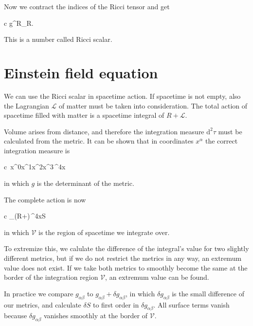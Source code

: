 \documentclass[11pt,oneside%
]{memoir}
\newenvironment{eqna}{\begin{IEEEeqnarray*}{c}}{\end{IEEEeqnarray*}\ignorespacesafterend}
\newcommand{\dd}{\mathrm{d}}
\begin{document}
Now we contract the indices of the Ricci tensor and get
\begin{eqna}
g^{\alpha\beta}R_{\alpha\beta}\doteq R.
\end{eqna}
This is a number called Ricci scalar.


\section{Einstein field equation}

We can use the Ricci scalar in spacetime action. If spacetime is not empty, also the Lagrangian \(\mathcal{L}\) of matter must be taken into consideration. The total action of spacetime filled with matter is a spacetime integral of \(R+\mathcal{L}\).

Volume arises from distance, and therefore the integration measure \(\dd^2\tau\) must be calculated from the metric. It can be shown that in coordinates \(x^\alpha\) the correct integration measure is
\begin{eqna}
\,\dd x^0\dd x^1\dd x^2\dd x^3\doteq{}\,\dd^4x
\end{eqna}
in which \(g\) is the determinant of the metric.

The complete action is now
\begin{eqna}
\int_(R+)\,\dd^4x\doteq S
\end{eqna}
in which \(\mathcal{V}\) is the region of spacetime we integrate over.


To extremize this, we calulate the difference of the integral's value for two slightly different metrics, but if we do not restrict the metrics in any way, an extremum value does not exist. If we take both metrics to smoothly become the same at the border of the integration region \(\mathcal{V}\), an extremum value can be found.

In practice we compare \(g_{\alpha\beta}\) to \(g_{\alpha\beta}+\delta g_{\alpha\beta}\), in which \(\delta g_{\alpha\beta}\) is the small difference of our metrics, and calculate \(\delta S\) to first order in \(\delta g_{\alpha\beta}\). All surface terms vanish because \(\delta g_{\alpha\beta}\) vanishes smoothly at the border of \(\mathcal{V}\).
\end{document}

